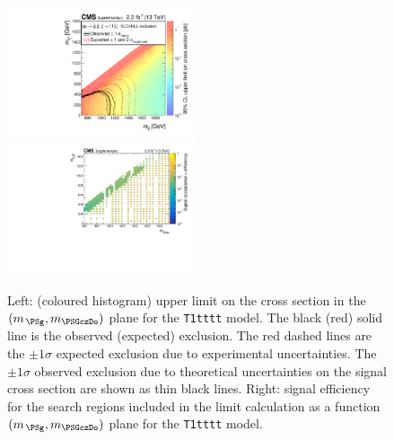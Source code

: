 \begin{figure}[t]
  \begin{center}
    \includegraphics[width=0.49\textwidth]{RA1T1ttttXSEC_aux} \, 
    \includegraphics[width=0.49\textwidth]{T1tttt_merging_4_cats_aux} \,     
  \end{center}
  \caption{Left: (coloured histogram) upper limit on the cross section in the $(m_{\,\PSg}, m_{\PSGczDo})$ plane for the \texttt{T1tttt} model. 
  The black (red) solid line is the observed (expected) exclusion. The red dashed lines are the $\pm1\sigma$ expected exclusion due to experimental uncertainties. 
  The $\pm1\sigma$ observed exclusion due to theoretical uncertainties on the signal cross section are shown as thin black lines. 
  Right: signal efficiency for the search regions included in the limit calculation as a function $(m_{\,\PSg}, m_{\PSGczDo})$ plane for the \texttt{T1tttt} model. 
  \label{fig:T1tttt_excl}}
\end{figure}

